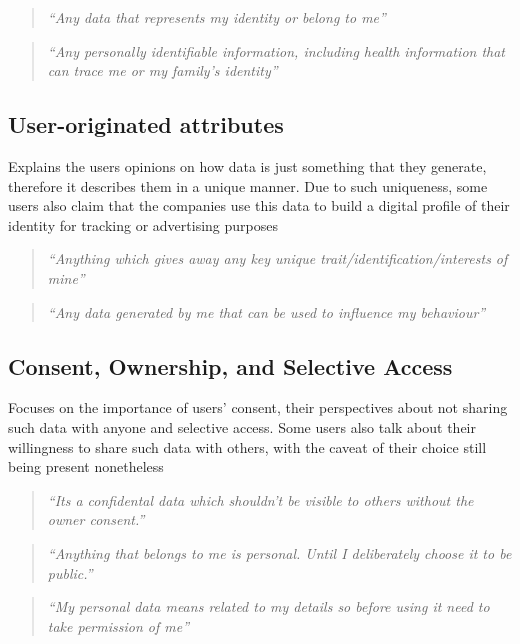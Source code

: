         \begin{quote}
            \textit{``Any data that represents my identity or belong to me''}
        \end{quote}
        \begin{quote}
            \textit{``Any personally identifiable information, including health information that can trace me or my family's identity''}
        \end{quote}
        
\subsection{User-originated attributes} \label{T1.2:Attributes}
Explains the users opinions on how data is just something that they generate, therefore it describes them in a unique manner. Due to such uniqueness, some users also claim that the companies use this data to build a digital profile of their identity for tracking or advertising purposes
        \begin{quote}
            \textit{``Anything which gives away any key unique trait/identification/interests of mine''}
        \end{quote}
        \begin{quote}
            \textit{``Any data generated by me that can be used to influence my behaviour''}
        \end{quote}
        
\subsection{Consent, Ownership, and Selective Access}  \label{T1.3:Access of info}
Focuses on the importance of users' consent, their perspectives about not sharing such data with anyone and selective access. Some users also talk about their willingness to share such data with others, with the caveat of their choice still being present nonetheless
        \begin{quote}
            \textit{``Its a confidental data which shouldn't be visible to others without the owner consent.''}
        \end{quote}
        \begin{quote}
            \textit{``Anything that belongs to me is personal. Until I deliberately choose it to be public.''}
        \end{quote}
        \begin{quote}
            \textit{``My personal data means related to my details so before using it need to take permission of me''}
        \end{quote}

